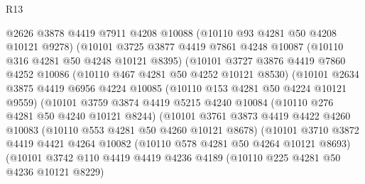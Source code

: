 \begin{lexlean}{R13}
\begin{coremodule}
                        @2626
                        @3878
                        @4419
                        @7911
                        @4208
                        @10088
                        (@10110 @93 @4281 @50 @4208 @10121 @9278)
                        (@10101
                          @3725
                          @3877
                          @4419
                          @7861
                          @4248
                          @10087
                          (@10110 @316 @4281 @50 @4248 @10121 @8395)
                          (@10101
                            @3727
                            @3876
                            @4419
                            @7860
                            @4252
                            @10086
                            (@10110 @467 @4281 @50 @4252 @10121 @8530)
                            (@10101
                              @2634
                              @3875
                              @4419
                              @6956
                              @4224
                              @10085
                              (@10110 @153 @4281 @50 @4224 @10121 @9559)
                              (@10101
                                @3759
                                @3874
                                @4419
                                @5215
                                @4240
                                @10084
                                (@10110 @276 @4281 @50 @4240 @10121 @8244)
                                (@10101
                                  @3761
                                  @3873
                                  @4419
                                  @4422
                                  @4260
                                  @10083
                                  (@10110 @553 @4281 @50 @4260 @10121 @8678)
                                  (@10101
                                    @3710
                                    @3872
                                    @4419
                                    @4421
                                    @4264
                                    @10082
                                    (@10110 @578 @4281 @50 @4264 @10121 @8693)
                                    (@10101
                                      @3742
                                      @110
                                      @4419
                                      @4419
                                      @4236
                                      @4189
                                      (@10110 @225 @4281 @50 @4236 @10121 @8229)

\end{coremodule}
\end{lexlean}
